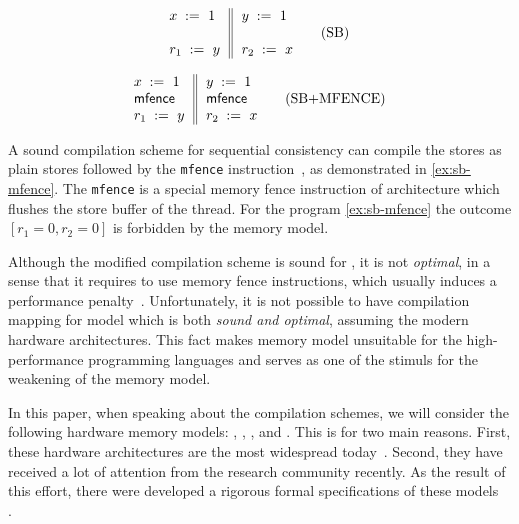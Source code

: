 \begin{minipage}{0.45\linewidth}
\begin{equation*}
\inarrII{
   \writeInst{}{x}{1}   \\
   \emptyInst           \\
   \readInst{}{r_1}{y}  \\
}{
  \writeInst{}{y}{1}   \\
  \emptyInst           \\
  \readInst{}{r_2}{x}  \\
}
\tag{SB}\label{ex:sb}
\end{equation*}
\end{minipage}\hfill%
\begin{minipage}{0.45\linewidth}
\begin{equation*}
\inarrII{
   \writeInst{}{x}{1}   \\
   \mfenceInst          \\
   \readInst{}{r_1}{y}  \\
}{
  \writeInst{}{y}{1}   \\
  \mfenceInst          \\
  \readInst{}{r_2}{x}  \\
}
\tag{SB+MFENCE}\label{ex:sb-mfence}
\end{equation*}
\end{minipage}

A sound compilation scheme for sequential consistency 
can compile the stores as plain stores followed 
by the \texttt{mfence} instruction~\cite{Sewell-al:CACM10, Batty-al:POPL11}, 
as demonstrated in \ref{ex:sb-mfence}. 
The \texttt{mfence} is a special memory fence instruction
of \xTSO architecture which flushes the store buffer of the thread. 
For the program \ref{ex:sb-mfence} the outcome $[r_1=0, r_2=0]$
is forbidden by the \xTSO memory model. 

Although the modified compilation scheme is sound for \SC, 
it is not \emph{optimal}, in a sense that 
it requires to use memory fence instructions, 
which usually induces a performance penalty~\cite{Marino-al:PLDI11, Liu-al:OOPSLA17}.
Unfortunately, it is not possible to have compilation mapping 
for \SC model which is both \emph{sound and optimal}, 
assuming the modern hardware architectures.     
This fact makes \SC memory model unsuitable  
for the high-performance programming languages
and serves as one of the stimuls for the weakening 
of the memory model. 
 
In this paper, when speaking about the compilation schemes, 
we will consider the following hardware memory models:
\xTSO, \POWER, , and . 
This is for two main reasons. 
First, these hardware architectures are the 
most widespread today~\cite{}. 
Second, they have received a lot of attention 
from the research community recently. 
As the result of this effort, 
there were developed a rigorous formal 
specifications of these models~%
\cite{Sewell-al:CACM10, Sarkar-al:PLDI11, 
Flur-al:POPL16, Pulte-al:POPL18}. 

